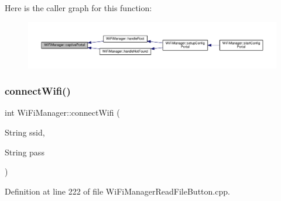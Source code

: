 Here is the caller graph for this function\+:\nopagebreak
\begin{figure}[H]
\begin{center}
\leavevmode
\includegraphics[width=350pt]{d4/dc8/class_wi_fi_manager_a4ef4298deb224212e5242c456669a973_icgraph}
\end{center}
\end{figure}
\mbox{\label{class_wi_fi_manager_ae0ae27b5543b47585728c084c3bbdca7}} 
\subsubsection{\texorpdfstring{connect\+Wifi()}{connectWifi()}}
{\footnotesize\ttfamily int Wi\+Fi\+Manager\+::connect\+Wifi (\begin{DoxyParamCaption}\item[{String}]{ssid,  }\item[{String}]{pass }\end{DoxyParamCaption})\hspace{0.3cm}{\ttfamily [private]}}



Definition at line 222 of file Wi\+Fi\+Manager\+Read\+File\+Button.\+cpp.


